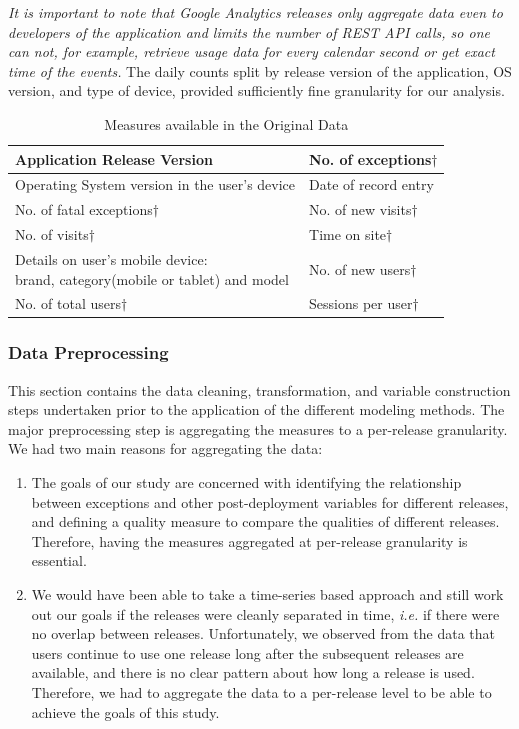 \documentclass[smallcondensed]{svjour3}     %
\begin{document}
\emph{It is important to note that Google Analytics releases only
aggregate data even to developers of the application and limits the
number of REST API calls, so one can not, for example, retrieve
usage data for every calendar second or get exact time of the
events.} The daily counts split by release version of
the application, OS version, and type of device, provided
sufficiently fine granularity for our analysis. 
\begin{table}
\caption{Measures available in the Original Data}\label{t:measures}
\begin{tabular}{|p{6.5cm}|p{4cm}|}\hline
Application Release Version & No. of exceptions$\dagger$\\\hline
Operating System version in the user's device &Date of record entry\\\hline
No. of fatal exceptions$\dagger$& No. of new visits$\dagger$\\\hline
No. of visits$\dagger$ & Time on site$\dagger$\\\hline
\pbox{6cm}{Details on user's mobile device:\\ brand, category(mobile or tablet) and model} & No. of new users$\dagger$\\\hline
No. of total users$\dagger$& Sessions per user$\dagger$\\ \hline
\end{tabular}
\vspace{-10pt}
\end{table}


\subsubsection{Data Preprocessing}\label{s:datapre}

This section contains the data cleaning, transformation, and variable 
construction steps undertaken prior to the application of the different modeling 
methods. The major preprocessing step is aggregating the measures to a per-release 
granularity. We had two main reasons for aggregating the data:
\begin{enumerate}
\item The goals of our study are concerned with identifying the relationship between exceptions and other post-deployment variables for different releases, and defining a quality measure to compare the qualities of different releases. Therefore, having the measures aggregated at per-release granularity is essential.
\item We would have been able to take a time-series based approach and still work out our goals if the releases were cleanly separated in time, \emph{i.e.} if there were no overlap between releases. Unfortunately, we observed from the data that users continue to use one release long after the subsequent releases are available, and there is no clear pattern about how long a release is used. Therefore, we had to aggregate the data to a per-release level to be able to achieve the goals of this study.
\end{enumerate}
\end{document}
